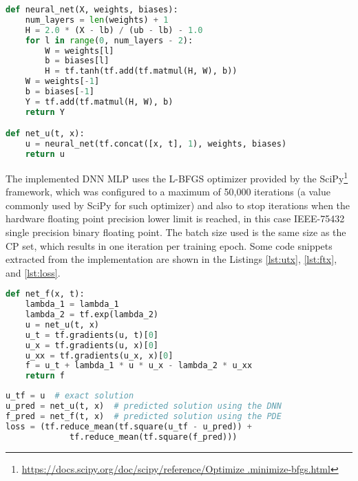 \documentclass[conference]{IEEEtran}
\begin{document}
\begin{minipage}[htb]{.94\columnwidth}
\begin{lstlisting}[language=Python, label=lst:utx, caption={
Snippet of Python code that implements $u(t,x)$, seen in the listing as \texttt{net\_u(t, x)}.
}]
def neural_net(X, weights, biases):
	num_layers = len(weights) + 1
	H = 2.0 * (X - lb) / (ub - lb) - 1.0
	for l in range(0, num_layers - 2):
		W = weights[l]
		b = biases[l]
		H = tf.tanh(tf.add(tf.matmul(H, W), b))
	W = weights[-1]
	b = biases[-1]
	Y = tf.add(tf.matmul(H, W), b)
	return Y

def net_u(t, x):
	u = neural_net(tf.concat([x, t], 1), weights, biases)
	return u
\end{lstlisting}
\end{minipage}%

The implemented DNN MLP uses the L-BFGS optimizer provided by the SciPy\footnote{\url{https://docs.scipy.org/doc/scipy/reference/Optimize .minimize-bfgs.html}} framework, which was configured to a maximum of 50,000 iterations (a value commonly used by SciPy for such optimizer) and also to stop iterations when the hardware floating point precision lower limit is reached, in this case IEEE-75432 single precision binary floating point. The batch size used is the same size as the CP set, which results in one iteration per training epoch. Some code snippets extracted from the implementation are shown in the Listings \ref{lst:utx}, \ref{lst:ftx}, and \ref{lst:loss}.

\begin{minipage}[htb]{.94\columnwidth}
\begin{lstlisting}[language=Python, label=lst:ftx, caption={
Snippet of Python code that implements $f(t,x)$, seen in the listing as \texttt{net\_f(x, t)}. 
The \texttt{net\_u} function is shown in \autoref{lst:utx}. 
The \texttt{tf.gradients} is part of the TensorFlow framework and is used in the gradient-based training and optimization algorithm.
}]
def net_f(x, t):
	lambda_1 = lambda_1
	lambda_2 = tf.exp(lambda_2)
	u = net_u(t, x)
	u_t = tf.gradients(u, t)[0]
	u_x = tf.gradients(u, x)[0]
	u_xx = tf.gradients(u_x, x)[0]
	f = u_t + lambda_1 * u * u_x - lambda_2 * u_xx
	return f
\end{lstlisting}
\end{minipage}%

\begin{minipage}[htb]{.94\columnwidth}
\begin{lstlisting}[language=Python, label=lst:loss, caption={
Snippet of Python code that implements the loss function (\texttt{loss}). The \texttt{u} is the exact solution. The \texttt{net\_u} function is shown in \autoref{lst:utx}. The \texttt{net\_f} function is shown in \autoref{lst:ftx}.
}]
u_tf = u  # exact solution
u_pred = net_u(t, x)  # predicted solution using the DNN
f_pred = net_f(t, x)  # predicted solution using the PDE
loss = (tf.reduce_mean(tf.square(u_tf - u_pred)) +
             tf.reduce_mean(tf.square(f_pred)))
\end{lstlisting}
\end{minipage}%
\end{document}
